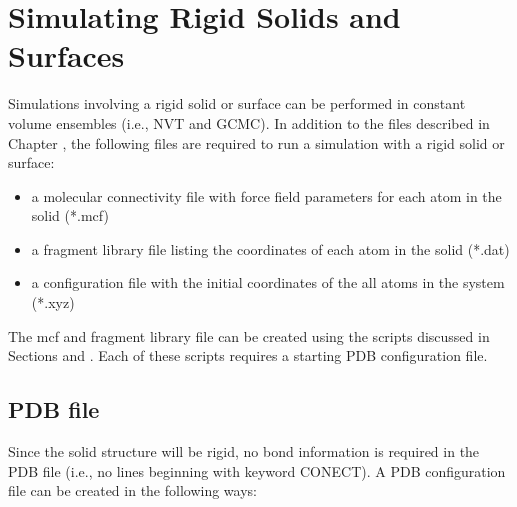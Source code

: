 \chapter{Simulating Rigid Solids and Surfaces}

Simulations involving a rigid solid or surface can be performed in constant volume ensembles
(i.e., NVT and GCMC). 
In addition to the files described in Chapter \label{ch:input_files}, 
the following files are required to run a simulation with a rigid solid or surface:

\begin{itemize}
\item a molecular connectivity file with force field parameters for each atom in the solid (*.mcf)
\item a fragment library file listing the coordinates of each atom in the solid (*.dat)
\item a configuration file with the initial coordinates of the all atoms in the system (*.xyz) 
\end{itemize} 

The mcf and fragment library file can be created using the scripts discussed in Sections \label{sec:mcf} and \label{sec:library_setup}. Each of these scripts requires a starting PDB configuration file.
 
\section{PDB file}\label{sec:solid_pdb}
Since the solid structure will be rigid, no bond information is required in the 
PDB file (i.e., no lines beginning with keyword CONECT). A PDB configuration file can be created in the following ways: 

